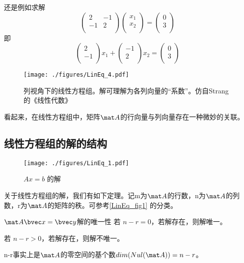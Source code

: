 \begin{example}{}
还是例如求解
$$
\begin{pmatrix}
2&-1\\
-1&2\\
\end{pmatrix}
\begin{pmatrix}
x_1\\
x_2\\
\end{pmatrix}
=
\begin{pmatrix}
0\\
3\\
\end{pmatrix}
$$
即
$$
\begin{pmatrix}
2\\
-1\\
\end{pmatrix}
x_1
+
\begin{pmatrix}
-1\\
2\\
\end{pmatrix}
x_2
=
\begin{pmatrix}
0\\
3\\
\end{pmatrix}
$$
\begin{figure}[ht]
\centering
\texttt{[image: ./figures/LinEq\_4.pdf]}
\caption{列视角下的线性方程组。解可理解为各列向量的“系数”。仿自Strang的《线性代数》} \label{LinEq_fig4}
\end{figure}
\end{example}
看起来，在线性方程组中，矩阵$\mat A$的行向量与列向量存在一种微妙的关联。

\subsection{线性方程组的解的结构}
\begin{figure}[ht]
\centering
\texttt{[image: ./figures/LinEq\_1.pdf]}
\caption{$Ax=b$ 的解} \label{LinEq_fig1}
\end{figure}


关于线性方程组的解，我们有如下定理。记m为$\mat A$的行数，n为$\mat A$的列数，r为$\mat A$的矩阵的秩。可参考\autoref{LinEq_fig1} 的分类。

\begin{theorem}{$\mat A \bvec x=\bvec y$解的唯一性}
若 $n-r=0$，若解存在，则解唯一。

若 $n-r>0$，若解存在，则解不唯一。
\end{theorem}
n-r事实上是$\mat A$的零空间的基个数$dim(Nul(\mat A))=n-r$。

